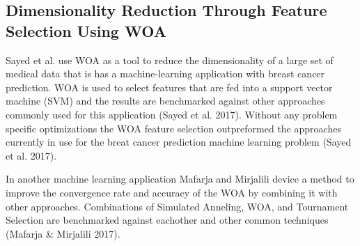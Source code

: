 \documentclass[11pt]{article}
\begin{document}
\subsection*{Dimensionality Reduction Through Feature Selection Using WOA}
Sayed et al. use WOA as a tool to reduce the dimensionality of a large set of medical data that is has a machine-learning application with breast cancer prediction.
WOA is used to select features that are fed into a support vector machine (SVM) and the results are benchmarked against other approaches commonly used for this application (Sayed et al. 2017).
Without any problem specific optimizations the WOA feature selection outpreformed the approaches currently in use for the breat cancer prediction machine learning problem (Sayed et al. 2017).

In another machine learning application Mafarja and Mirjalili device a method to improve the convergence rate and accuracy of the WOA by combining it with other approaches.
Combinations of Simulated Anneling, WOA, and Tournament Selection are benchmarked against eachother and other common techniques (Mafarja \& Mirjalili 2017).
\end{document}
